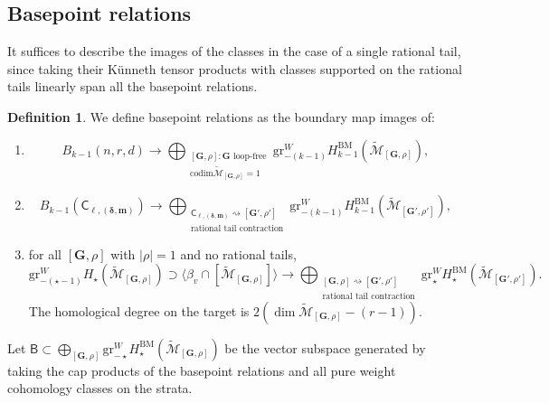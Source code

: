 \documentclass[12pt,reqno]{amsart}
\theoremstyle{definition}
\theoremstyle{definition}
\theoremstyle{definition}
\theoremstyle{definition}
\newtheorem{definition}[theorem]{Definition}
\newcommand{\Mtil}{\widetilde{\mathcal{M}}}
\newcommand{\gr}{\mathrm{gr}}
\begin{document}
\subsection{Basepoint relations}\label{subsec:baseptrel}
It suffices to describe the images of the classes in the case of a single rational tail, since taking their Künneth tensor products with classes supported on the rational tails linearly span all the basepoint relations.
\begin{definition}
  We define basepoint relations as the boundary map images of: 
  \begin{enumerate}
    \item $$B_{k-1}(n,r,d)\to \bigoplus_{\substack{[\mathbf{G},\rho]: \mathbf{G}\text{ loop-free} \\\text{codim}\Mtil_{[\mathbf{G},\rho]}=1}} \mathrm{gr}^W_{-(k-1)} H_{k-1}^{\mathrm{BM}}(\Mtil_{[\mathbf{G},\rho]}),$$
    \item $$B_{k-1}(\mathsf{C}_{\ell,(\boldsymbol{\delta},\boldsymbol{m})})\to \bigoplus_{\substack{\mathsf{C}_{\ell,(\boldsymbol{\delta},\boldsymbol{m})}\rightsquigarrow[\mathbf{G}',\rho']\\ \text{rational tail contraction}}} \mathrm{gr}^W_{-(k-1)} H_{k-1}^{\mathrm{BM}}(\Mtil_{[\mathbf{G}',\rho']}),$$
    \item for all $[\mathbf{G},\rho]$ with $|\rho| = 1$ and no rational tails,$$\gr^W_{-(\star-1)} H_{\star}(\Mtil_{[\mathbf{G},\rho]})\supset \langle \beta_{v} \cap [\Mtil_{[\mathbf{G},\rho]}] \rangle\to \bigoplus_{\substack{[\mathbf{G},\rho]\rightsquigarrow[\mathbf{G}',\rho']\\ \text{rational tail contraction}}} \gr^W_{\star}H^{\mathrm{BM}}_{\star}(\Mtil_{[\mathbf{G}',\rho']}).$$ The homological degree on the target is $2(\dim \Mtil_{[\mathbf{G},\rho]}-(r-1)).$
  \end{enumerate}

  Let $\boldsymbol{\mathsf{B}}\subset \bigoplus_{[\mathbf{G},\rho]}\gr^W_{-\star}H_{\star}^{\mathrm{BM}}(\Mtil_{[\mathbf{G},\rho]})$ be the vector subspace generated by taking the cap products of the basepoint relations and all pure weight cohomology classes on the strata.
\end{definition}
\end{document}
